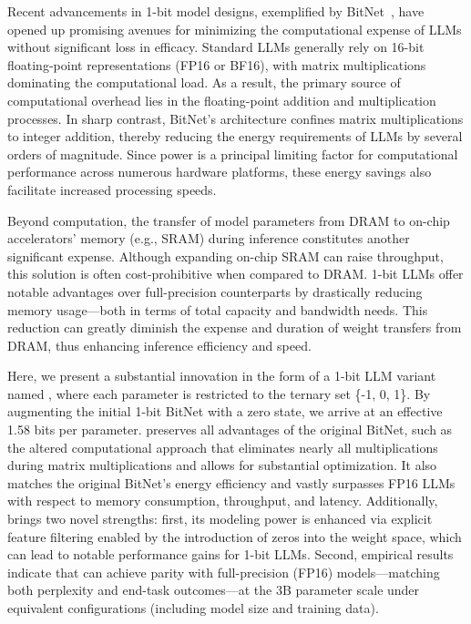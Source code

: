 Recent advancements in 1-bit model designs, exemplified by BitNet~\cite{bitnet}, have opened up promising avenues for minimizing the computational expense of LLMs without significant loss in efficacy. Standard LLMs generally rely on 16-bit floating-point representations (FP16 or BF16), with matrix multiplications dominating the computational load. As a result, the primary source of computational overhead lies in the floating-point addition and multiplication processes. In sharp contrast, BitNet’s architecture confines matrix multiplications to integer addition, thereby reducing the energy requirements of LLMs by several orders of magnitude. Since power is a principal limiting factor for computational performance across numerous hardware platforms, these energy savings also facilitate increased processing speeds.

Beyond computation, the transfer of model parameters from DRAM to on-chip accelerators’ memory (e.g., SRAM) during inference constitutes another significant expense. Although expanding on-chip SRAM can raise throughput, this solution is often cost-prohibitive when compared to DRAM. 1-bit LLMs offer notable advantages over full-precision counterparts by drastically reducing memory usage—both in terms of total capacity and bandwidth needs. This reduction can greatly diminish the expense and duration of weight transfers from DRAM, thus enhancing inference efficiency and speed.

Here, we present a substantial innovation in the form of a 1-bit LLM variant named \textbf{}, where each parameter is restricted to the ternary set \{-1, 0, 1\}. By augmenting the initial 1-bit BitNet with a zero state, we arrive at an effective 1.58 bits per parameter.  preserves all advantages of the original BitNet, such as the altered computational approach that eliminates nearly all multiplications during matrix multiplications and allows for substantial optimization. It also matches the original BitNet's energy efficiency and vastly surpasses FP16 LLMs with respect to memory consumption, throughput, and latency. Additionally,  brings two novel strengths: first, its modeling power is enhanced via explicit feature filtering enabled by the introduction of zeros into the weight space, which can lead to notable performance gains for 1-bit LLMs. Second, empirical results indicate that  can achieve parity with full-precision (FP16) models—matching both perplexity and end-task outcomes—at the 3B parameter scale under equivalent configurations (including model size and training data).

